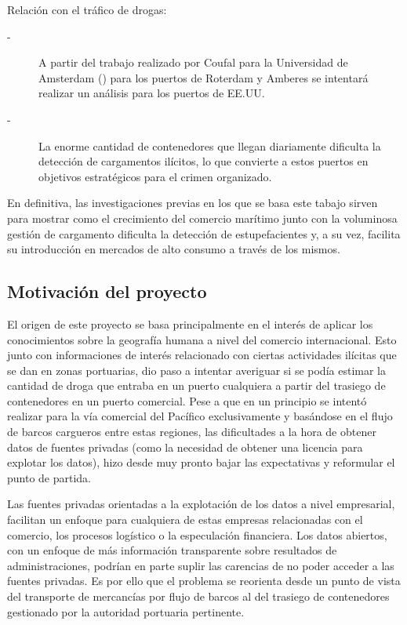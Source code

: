 \documentclass[12pt]{article}
\begin{document}
	Relación con el tráfico de drogas:
	\begin{description}
		\item[-] A partir del trabajo realizado por Coufal para la Universidad de Amsterdam (\cite{coufal2023cities}) para los puertos de Roterdam y Amberes se intentará realizar un análisis para los puertos de EE.UU.
		\item[-] La enorme cantidad de contenedores que llegan diariamente dificulta la detección de cargamentos ilícitos, lo que convierte a estos puertos en objetivos estratégicos para el crimen organizado.
	\end{description}

	En definitiva, las investigaciones previas en los que se basa este tabajo sirven para mostrar como el crecimiento del comercio marítimo junto con la voluminosa gestión de cargamento dificulta la detección de estupefacientes y, a su vez, facilita su introducción en mercados de alto consumo a través de los mismos.
	
	\subsection{\label{motivacion}Motivación del proyecto}
	El origen de este proyecto se basa principalmente en el interés de aplicar los conocimientos sobre la geografía humana a nivel del comercio internacional. Esto junto con informaciones de interés relacionado con ciertas actividades ilícitas que se dan en zonas portuarias, dio paso a intentar averiguar si se podía estimar la cantidad de droga que entraba en un puerto cualquiera a partir del trasiego de contenedores en un puerto comercial. Pese a que en un principio se intentó realizar para la vía comercial del Pacífico exclusivamente y basándose en el flujo de barcos cargueros entre estas regiones, las dificultades a la hora de obtener datos de fuentes privadas (como la necesidad de obtener una licencia para explotar los datos), hizo desde muy pronto bajar las expectativas y reformular el punto de partida.
	
	Las fuentes privadas orientadas a la explotación de los datos a nivel empresarial, facilitan un enfoque para cualquiera de estas empresas relacionadas con el comercio, los procesos logístico o la especulación financiera. Los datos abiertos, con un enfoque de más información transparente sobre resultados de administraciones, podrían en parte suplir las carencias de no poder acceder a las fuentes privadas. Es por ello que el problema se reorienta desde un punto de vista del transporte de mercancías por flujo de barcos al del trasiego de contenedores gestionado por la autoridad portuaria pertinente.
	
\end{document}
